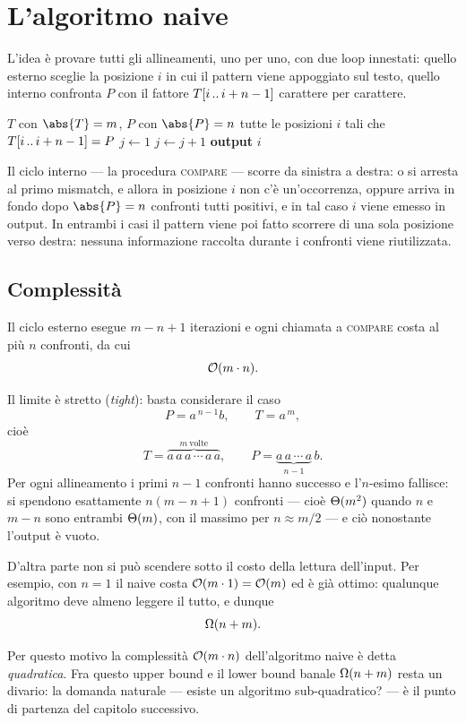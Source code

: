 \section{L'algoritmo naive}
\label{sec:naive}

L'idea è provare tutti gli allineamenti, uno per uno, con due loop innestati: quello
esterno sceglie la posizione $i$ in cui il pattern viene appoggiato sul testo, quello
interno confronta $P$ con il fattore $T[i\,..\,i+n-1]$ carattere per carattere.

\begin{algorithm}[H]
\caption{Algoritmo naive per il pattern matching esatto}
\label{alg:naive}
\begin{algorithmic}[1]
\Require $T$ con $\abs{T}=m$, $P$ con $\abs{P}=n$
\Ensure tutte le posizioni $i$ tali che $T[i\,..\,i+n-1]=P$
    \State $j \gets 1$
        \State $j \gets j+1$
    \EndWhile
        \State \textbf{output} $i$
    \EndIf
\EndFor
\end{algorithmic}
\end{algorithm}

Il ciclo interno --- la procedura \textsc{compare} --- scorre da sinistra a destra: o si
arresta al primo mismatch, e allora in posizione $i$ non c'è un'occorrenza, oppure arriva
in fondo dopo $\abs{P}=n$ confronti tutti positivi, e in tal caso $i$ viene emesso in
output. In entrambi i casi il pattern viene poi fatto scorrere di una sola posizione verso
destra: nessuna informazione raccolta durante i confronti viene riutilizzata.

\subsection{Complessità}
\label{sec:naive-complessita}

Il ciclo esterno esegue $m-n+1$ iterazioni e ogni chiamata a \textsc{compare} costa al più
$n$ confronti, da cui
\[
  \mathcal{O}(m\cdot n).
\]

Il limite è stretto (\emph{tight}): basta considerare il caso
\[
  P=a^{\,n-1}b, \qquad T=a^{\,m},
\]
cioè
\[
  T=\overbrace{a\,a\,a\,\cdots\,a\,a}^{m\ \text{volte}},
  \qquad
  P=\underbrace{a\,a\,\cdots\,a}_{n-1}\,b .
\]
Per ogni allineamento i primi $n-1$ confronti hanno successo e l'$n$-esimo fallisce: si
spendono esattamente $n(m-n+1)$ confronti --- cioè $\Theta(m^{2})$ quando $n$ e $m-n$ sono
entrambi $\Theta(m)$, con il massimo per $n\approx m/2$ --- e ciò nonostante l'output è vuoto.

D'altra parte non si può scendere sotto il costo della lettura dell'input. Per esempio, con
$n=1$ il naive costa $\mathcal{O}(m\cdot 1)=\mathcal{O}(m)$ ed è già ottimo: qualunque algoritmo deve almeno
leggere il tutto, e dunque
\[
  \Omega(n+m).
\]

Per questo motivo la complessità $\mathcal{O}(m\cdot n)$ dell'algoritmo naive è detta
\emph{quadratica}. Fra questo upper bound e il lower bound banale $\Omega(n+m)$ resta un
divario: la domanda naturale --- esiste un algoritmo sub-quadratico? --- è il punto di
partenza del capitolo successivo.
